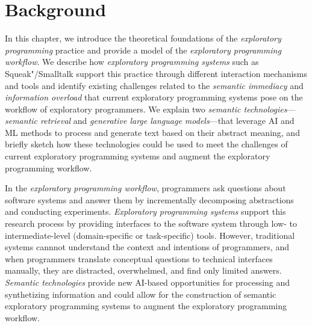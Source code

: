 
\chapter{Background}
\label{cha:background}

In this chapter, we introduce the theoretical foundations of the \emph{exploratory programming} practice and provide a model of the \emph{exploratory programming workflow}.
We describe how \emph{exploratory programming systems} such as Squeak"/Smalltalk support this practice through different interaction mechanisms and tools and identify existing challenges related to the \emph{semantic immediacy} and \emph{information overload} that current exploratory programming systems pose on the workflow of exploratory programmers.
We explain two \emph{semantic technologies}---\emph{semantic retrieval} and \emph{generative large language models}---that leverage AI and ML methods to process and generate text based on their abstract meaning, and briefly sketch how these technologies could be used to meet the challenges of current exploratory programming systems and augment the exploratory programming workflow.


\begin{summary}
	In the \emph{exploratory programming workflow}, programmers ask questions about software systems and answer them by incrementally decomposing abstractions and conducting experiments.
	\emph{Exploratory programming systems} support this research process by providing interfaces to the software system through low- to intermediate-level (domain-specific or task-specific) tools.
	However, traditional systems cannnot understand the context and intentions of programmers, and when programmers translate conceptual questions to technical interfaces manually, they are distracted, overwhelmed, and find only limited answers.
	\emph{Semantic technologies} provide new AI-based opportunities for processing and synthetizing information and could allow for the construction of semantic exploratory programming systems to augment the exploratory programming workflow.
\end{summary}
